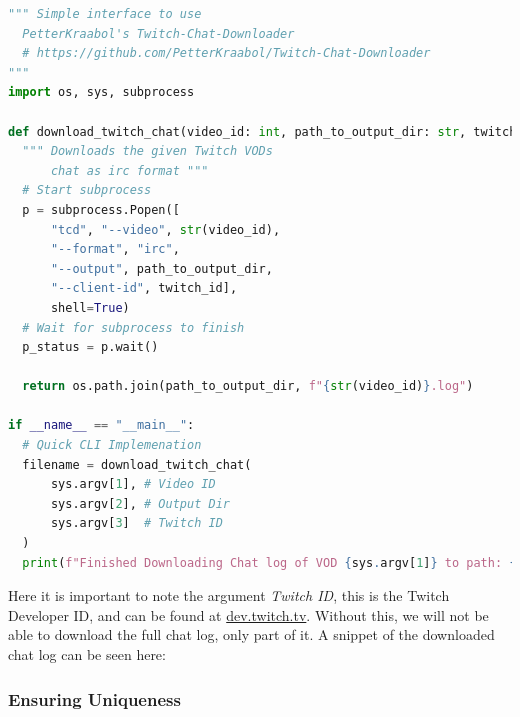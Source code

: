 \documentclass{article}
\begin{document}
\begin{lstlisting}[language=python]
""" Simple interface to use
  PetterKraabol's Twitch-Chat-Downloader
  # https://github.com/PetterKraabol/Twitch-Chat-Downloader
"""
import os, sys, subprocess

def download_twitch_chat(video_id: int, path_to_output_dir: str, twitch_id: str) -> str:
  """ Downloads the given Twitch VODs
      chat as irc format """
  # Start subprocess
  p = subprocess.Popen([
      "tcd", "--video", str(video_id),
      "--format", "irc",
      "--output", path_to_output_dir,
      "--client-id", twitch_id],
      shell=True)
  # Wait for subprocess to finish
  p_status = p.wait()

  return os.path.join(path_to_output_dir, f"{str(video_id)}.log")

if __name__ == "__main__":
  # Quick CLI Implemenation
  filename = download_twitch_chat(
      sys.argv[1], # Video ID
      sys.argv[2], # Output Dir
      sys.argv[3]  # Twitch ID
  )
  print(f"Finished Downloading Chat log of VOD {sys.argv[1]} to path: {filename}")
\end{lstlisting}
Here it is important to note the argument \textit{Twitch ID}, this is
the Twitch Developer ID, and can be found at \href{https://dev.twitch.tv}{dev.twitch.tv}. Without this, we will not be
able to download the full chat log, only part of it.
\newline\newline
A snippet of the downloaded chat log can be seen here:


\subsubsection{Ensuring Uniqueness}
\end{document}
